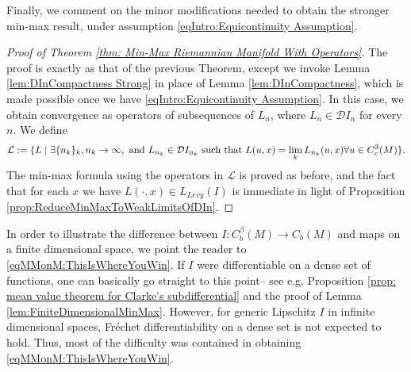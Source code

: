 \documentclass[11pt,reqno]{amsart}
\numberwithin{equation}{section}
\theoremstyle{plain}
\begin{document}
Finally, we comment on the minor modifications needed to obtain the stronger min-max result, under assumption \eqref{eqIntro:Equicontinuity Assumption}.
\begin{proof}[Proof of Theorem \ref{thm: Min-Max Riemannian Manifold With Operators}]
  The proof is exactly as that of the previous Theorem, except we invoke Lemma \ref{lem:DInCompactness Strong} in place of Lemma \ref{lem:DInCompactness}, which is made possible once we have \eqref{eqIntro:Equicontinuity Assumption}. In this case, we obtain convergence as operators of subsequences of $L_n$, where $L_n\in \mathcal{D}I_n$ for every $n$. We define
  \begin{align*}
    \mathcal{L} := \{ L \mid \exists \{n_k\}_k, n_k\to \infty, \textnormal{ and } L_{n_k} \in \mathcal{D} I_{n_k} \textnormal{ such that } L(u,x) = \lim\limits_{k} L_{n_k}(u,x) \forall u\in C^3_c(M)\}. 
  \end{align*}	  
  The min-max formula using the operators in $\mathcal{L}$ is proved as before, and the fact that for each $x$ we have $L(\cdot,x)\in L_{Levy}(I)$ is immediate in light of Proposition \ref{prop:ReduceMinMaxToWeakLimitsOfDIn}.
  
\end{proof}

\begin{rem}
	In order to illustrate the difference between $I: C^\beta_b(M)\to C_b(M)$ and maps on a finite dimensional space, we point the reader to \eqref{eqMMonM:ThisIsWhereYouWin}.  If $I$ were differentiable on a dense set of functions, one can basically go straight to this point-- see e.g. Proposition \ref{prop: mean value theorem for Clarke's subdifferential} and the proof of Lemma \ref{lem:FiniteDimensionalMinMax}.  However, for generic Lipschitz $I$ in infinite dimensional spaces, Fr\'echet differentiability on a dense set is not expected to hold.  Thus, most of the difficulty was contained in obtaining \eqref{eqMMonM:ThisIsWhereYouWin}.
\end{rem}
\end{document}
